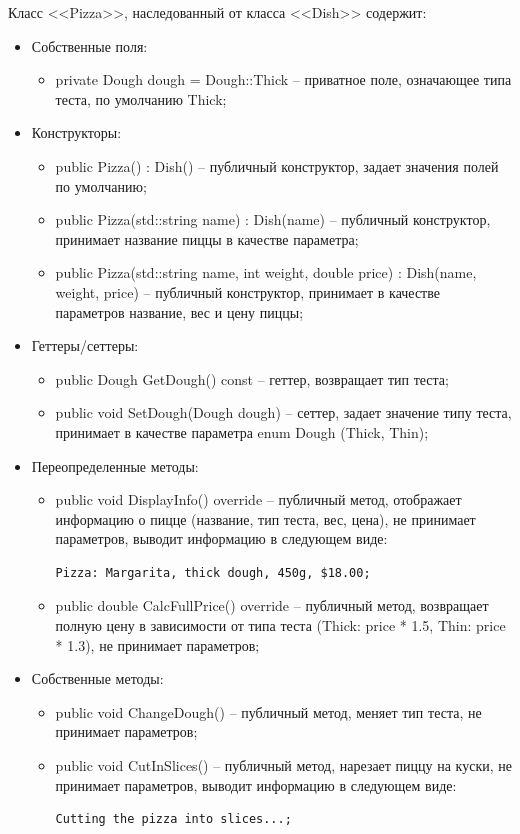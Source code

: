 \documentclass[a4paper,14pt]{extarticle}
\begin{document}
Класс <<Pizza>>, наследованный от класса <<Dish>> содержит:
\begin{itemize}
  \item[--] Собственные поля:
  \begin{itemize}
    \item[--] private Dough dough = Dough::Thick -- приватное поле, означающее типа теста, по умолчанию Thick;
  \end{itemize}
  \item[--] Конструкторы:
  \begin{itemize}
    \item[--] public Pizza() : Dish() -- публичный конструктор, задает значения полей по умолчанию;
    \item[--] public Pizza(std::string name) : Dish(name) -- публичный конструктор, принимает название пиццы в качестве параметра;
    \item[--] public Pizza(std::string name, int weight, double price) : Dish(name, weight, price) -- публичный конструктор, принимает в качестве параметров название, вес и цену пиццы;
  \end{itemize}
  \item[--] Геттеры/сеттеры:
  \begin{itemize}
    \item[--] public Dough GetDough() const -- геттер, возвращает тип теста;
    \item[--] public void SetDough(Dough dough) -- сеттер, задает значение типу теста, принимает в качестве параметра enum Dough (Thick, Thin);
  \end{itemize}
  \item[--] Переопределенные методы:
  \begin{itemize}
    \item[--] public void DisplayInfo() override -- публичный метод, отображает информацию о пицце (название, тип теста, вес, цена), не принимает параметров, выводит информацию в следующем виде:
    \begin{Verbatim}[tabsize=4]
Pizza: Margarita, thick dough, 450g, $18.00;
    \end{Verbatim}
    \item[--] public double CalcFullPrice() override -- публичный метод, возвращает полную цену в зависимости от типа теста (Thick: price * 1.5, Thin: price * 1.3), не принимает параметров;
  \end{itemize}
  \item[--] Собственные методы:
  \begin{itemize}
    \item[--] public void ChangeDough() -- публичный метод, меняет тип теста, не принимает параметров;
    \item[--] public void CutInSlices() -- публичный метод, нарезает пиццу на куски, не принимает параметров, выводит информацию в следующем виде:
    \begin{Verbatim}[tabsize=4]
Cutting the pizza into slices...;
    \end{Verbatim}
  \end{itemize}
\end{itemize}
\end{document}
